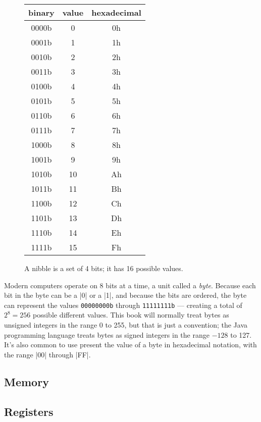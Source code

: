\documentclass[11pt,letter]{book}
\begin{document}


\begin{figure}
\begin{tabular}{ccc}
binary & value & hexadecimal\\
\hline
0000b & 0 & 0h \\
0001b & 1 & 1h \\
0010b & 2 & 2h \\
0011b & 3 & 3h \\
0100b & 4 & 4h \\
0101b & 5 & 5h \\
0110b & 6 & 6h \\
0111b & 7 & 7h \\
1000b & 8 & 8h \\
1001b & 9 & 9h \\
1010b & 10& Ah \\
1011b & 11& Bh \\
1100b & 12& Ch \\
1101b & 13& Dh \\
1110b & 14& Eh \\
1111b & 15& Fh \\
\hline
\end{tabular}
\caption{A nibble is a set of 4 bits; it has 16 possible values.}\label{nibble}
\end{figure}

Modern computers operate on 8 bits at a time, a unit called a
\emph{byte}. Because each bit in the byte can be a |0| or a |1|, and
because the bits are ordered, the byte can represent the values
\texttt{00000000b} through \texttt{11111111b} --- creating a
total of $2^8=256$ possible different values. This book will normally treat
bytes as unsigned integers in the range 0 to 255, but that is just a
convention; the Java programming language treats bytes as signed
integers in the range $-128$ to 127. It's also common to use present
the value of a byte in hexadecimal notation, with the range |00|
through |FF|.

\subsection{Memory}

\subsection{Registers}
\end{document}
